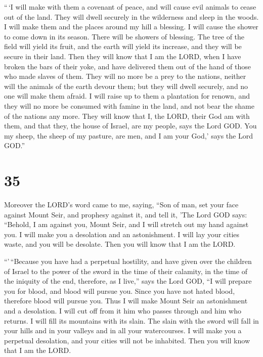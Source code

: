  ``\,`I will make with them a covenant of peace, and will
cause evil animals to cease out of the land. They will dwell securely in
the wilderness and sleep in the woods.  I will make them
and the places around my hill a blessing. I will cause the shower to
come down in its season. There will be showers of blessing.
 The tree of the field will yield its fruit, and the earth
will yield its increase, and they will be secure in their land. Then
they will know that I am the LORD, when I have broken the bars of their
yoke, and have delivered them out of the hand of those who made slaves
of them.  They will no more be a prey to the nations,
neither will the animals of the earth devour them; but they will dwell
securely, and no one will make them afraid.  I will raise
up to them a plantation for renown, and they will no more be consumed
with famine in the land, and not bear the shame of the nations any more.
 They will know that I, the LORD, their God am with them,
and that they, the house of Israel, are my people, says the Lord GOD.
 You my sheep, the sheep of my pasture, are men, and I am
your God,' says the Lord GOD.''

\hypertarget{section-33}{%
\section{35}\label{section-33}}

 Moreover the LORD's word came to me, saying, 
``Son of man, set your face against Mount Seir, and prophesy against it,
 and tell it, 'The Lord GOD says: ``Behold, I am against
you, Mount Seir, and I will stretch out my hand against you. I will make
you a desolation and an astonishment.  I will lay your
cities waste, and you will be desolate. Then you will know that I am the
LORD.

 ``'\,``Because you have had a perpetual hostility, and have
given over the children of Israel to the power of the sword in the time
of their calamity, in the time of the iniquity of the end, 
therefore, as I live,'' says the Lord GOD, ``I will prepare you for
blood, and blood will pursue you. Since you have not hated blood,
therefore blood will pursue you.  Thus I will make Mount
Seir an astonishment and a desolation. I will cut off from it him who
passes through and him who returns.  I will fill its
mountains with its slain. The slain with the sword will fall in your
hills and in your valleys and in all your watercourses.  I
will make you a perpetual desolation, and your cities will not be
inhabited. Then you will know that I am the LORD.

